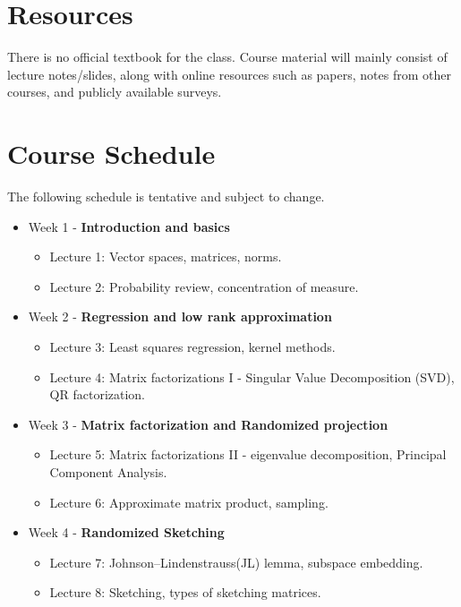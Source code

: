 \documentclass[a4paper,11pt]{article}
\begin{document}
\section*{Resources}
There is no official textbook for the class. Course material will mainly consist of lecture notes/slides, along with online resources such as papers, notes from other courses, and publicly available surveys. 

\section*{Course Schedule}

The following schedule is tentative and subject to change.
\begin{itemize}
\item Week 1 - {\bf Introduction and basics}
\begin{itemize}
\item Lecture 1: Vector spaces, matrices, norms.
\item Lecture 2:  Probability review, concentration of measure.
\end{itemize}

\item Week 2  - {\bf Regression and low rank approximation}
\begin{itemize}
\item Lecture 3: Least squares regression, kernel methods.
\item Lecture 4:  Matrix factorizations I - Singular Value Decomposition (SVD),  QR factorization.
\end{itemize}

\item Week 3 -  {\bf Matrix factorization and Randomized projection}
\begin{itemize}
\item Lecture 5: Matrix factorizations II - eigenvalue decomposition, Principal Component Analysis.
\item Lecture 6: Approximate matrix product, sampling. 
\end{itemize}

\item Week 4  - {\bf Randomized Sketching}
\begin{itemize}
\item Lecture 7: Johnson–Lindenstrauss(JL) lemma, subspace embedding. 
\item Lecture 8: Sketching, types of sketching matrices. 
\end{itemize}


\end{itemize}
\end{document}
